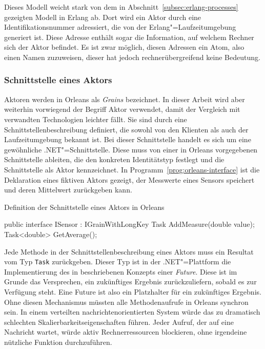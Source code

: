 Dieses Modell weicht stark von dem in Abschnitt~\ref{subsec:erlang-processes} gezeigten Modell in Erlang ab. Dort wird ein Aktor durch eine Identifikationsnummer adressiert, die von der Erlang"=Laufzeitumgebung generiert ist. Diese Adresse enthält sogar die Information, auf welchem Rechner sich der Aktor befindet. Es ist zwar möglich, diesen Adressen ein Atom, also einen Namen zuzuweisen, dieser hat jedoch rechnerübergreifend keine Bedeutung.

\subsubsection{Schnittstelle eines Aktors}

Aktoren werden in Orleans als \textit{Grains} bezeichnet. In dieser Arbeit wird aber weiterhin vorwiegend der Begriff Aktor verwendet, damit der Vergleich mit verwandten Technologien leichter fällt. Sie sind durch eine Schnittstellenbeschreibung definiert, die sowohl von den Klienten als auch der Laufzeitumgebung bekannt ist. Bei dieser Schnittstelle handelt es sich um eine gewöhnliche .NET"=Schnittstelle. Diese muss von einer in Orleans vorgegebenen Schnittstelle ableiten, die den konkreten Identitätstyp festlegt und die Schnittstelle als Aktor kennzeichnet. In Programm~\ref{prog:orleans-interface} ist die Deklaration eines fiktiven Aktors gezeigt, der Messwerte eines Sensors speichert und deren Mittelwert zurückgeben kann.

\begin{program}[!hbt]
\caption{Definition der Schnittstelle eines Aktors in Orleans}
\label{prog:orleans-interface}
\begin{CsCode}
public interface ISensor : IGrainWithLongKey {
	Task AddMeasure(double value);
	Task<double> GetAverage();
}
\end{CsCode}
\end{program}

Jede Methode in der Schnittstellenbeschreibung eines Aktors muss ein Resultat vom Typ \lstinline{Task} zurückgeben. Dieser Typ ist in der .NET"=Plattform die Implementierung des in \cite{Baker:1977:IGC:800228.806932} beschriebenen Konzepts einer \textit{Future}. Diese ist im Grunde das Versprechen, ein zukünftiges Ergebnis zurückzuliefern, sobald es zur Verfügung steht. Eine Future ist also ein Platzhalter für ein zukünftiges Ergebnis. Ohne diesen Mechanismus müssten alle Methodenaufrufe in Orleans synchron sein. In einem verteilten nachrichtenorientierten System würde das zu dramatisch schlechten Skalierbarkeitseigenschaften führen. Jeder Aufruf, der auf eine Nachricht wartet, würde aktiv Rechnerressourcen blockieren, ohne irgendeine nützliche Funktion durchzuführen.

